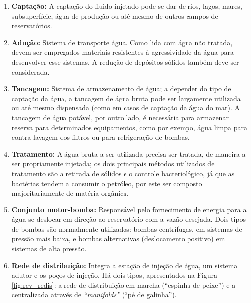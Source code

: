 \begin{enumerate}
\item \textbf{Capta\c{c}\~{a}o:} A capta\c{c}\~{a}o do fluido injetado pode se dar de rios, lagos, mares, subsuperf\'{i}cie, \'{a}gua de produ\c{c}\~{a}o ou at\'{e} mesmo de outros campos de reservat\'{o}rios.

\item \textbf{Adu\c{c}\~{a}o:} Sistema de transporte \'{a}gua. Como lida com \'{a}gua n\~{a}o tratada, devem ser empregados materiais resistentes \`{a} agressividade da \'{a}gua para desenvolver esse sistemas. A redu\c{c}\~{a}o de dep\'{o}sitos s\'{o}lidos tamb\'{e}m deve ser considerada.

\item \textbf{Tancagem:} Sistema de armazenamento de \'{a}gua; a depender do tipo de capta\c{c}\~{a}o da \'{a}gua, a tancagem de \'{a}gua bruta pode ser largamente utilizada ou at\'{e} mesmo dispensada (como em casos de capta\c{c}\~{a}o da \'{a}gua do mar). A tancagem de \'{a}gua pot\'{a}vel, por outro lado, \'{e} necess\'{a}ria para armazenar reserva para determinados equipamentos, como por exempo, \'{a}gua limpa para contra-lavagem dos filtros ou para refrigera\c{c}\~{a}o de bombas.

\item \textbf{Tratamento:} A \'{a}gua bruta a ser utilizada precisa ser tratada, de maneira a ser propriamente injetada; os dois principais m\'{e}todos utilizados de tratamento s\~{a}o a retirada de s\'{o}lidos e o controle bacteriol\'{o}gico, j\'{a} que as bact\'{e}rias tendem a consumir o petr\'{o}leo, por este ser composto majoritariamente de mat\'{e}ria org\^{a}nica.

\item \textbf{Conjunto motor-bomba:} Respons\'{a}vel pelo fornecimento de energia para a \'{a}gua se deslocar em dire\c{c}\~{a}o ao reservat\'{o}rio com a vaz\~{a}o desejada. Dois tipos de bombas s\~{a}o normalmente utilizados: bombas centr\'{i}fugas, em sistemas de press\~{a}o mais baixa, e bombas alternativas (deslocamento positivo) em sistemas de alta press\~{a}o.

\item \textbf{Rede de distribui\c{c}\~{a}o:} Integra a esta\c{c}\~{a}o de inje\c{c}\~{a}o de \'{a}gua, um sistema adutor e os po\c{c}os de inje\c{c}\~{a}o. H\'{a} dois tipos, apresentados na Figura \ref{fig:rev_redis}: a rede de distribui\c{c}\~{a}o em marcha (``espinha de peixe'') e a centralizada atrav\'{e}s de \textit{``manifolds''} (``p\'{e} de galinha'').


\end{enumerate}
